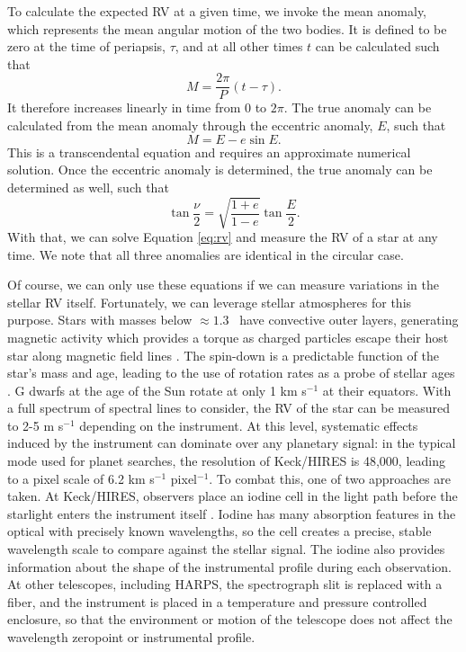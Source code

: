 To calculate the expected RV at a given time, we invoke the mean anomaly, which represents the mean angular motion of the 
two bodies. 
It is defined to be zero at the time of periapsis, $\tau$, and at all other times $t$ can 
be calculated such that
\begin{equation}
M = \frac{2\pi}{P}(t-\tau).
\end{equation}
It therefore increases linearly in time from 0 to $2\pi$.
The true anomaly can be calculated from the mean anomaly through the eccentric anomaly, 
$E$, such that
\begin{equation}
M = E - e \sin E.
\end{equation}
This is a transcendental equation and requires an approximate numerical solution.
Once the eccentric anomaly is determined, the true anomaly can be determined as well,
such that
\begin{equation}
\tan \frac{\nu}{2} = \sqrt{\frac{1+e}{1-e}} \tan \frac{E}{2}.
\end{equation}
With that, we can solve Equation \ref{eq:rv} and measure the RV of a star at any time.
We note that all three anomalies are identical in the circular case.

Of course, we can only use these equations if we can measure variations in the stellar RV
itself.
Fortunately, we can leverage stellar atmospheres for this purpose.
Stars with masses below $\approx 1.3$ \msun\ have convective outer layers, generating
magnetic activity which provides a torque as charged particles escape their 
host star along magnetic
field lines \citep{Shu94}.
The spin-down is a predictable function of the star's mass and age, leading to the use
of rotation rates as a probe of stellar ages \citep{Barnes03}.
G dwarfs at the age of the Sun rotate at only 1 km s$^{-1}$ at their equators.
With a full spectrum of spectral lines to consider, the RV of the star can be 
measured to 2-5 m s$^{-1}$ depending on the instrument.
At this level, systematic effects induced by the instrument can dominate over any planetary
signal: in the typical mode used for planet searches,
the resolution of Keck/HIRES is 48,000, leading to a pixel scale of 6.2 km s$^{-1}$ pixel$^{-1}$.
To combat this, one of two approaches are taken.
At Keck/HIRES, observers place an iodine cell in the light path before the starlight
enters the instrument itself \citep{Butler96}.
Iodine has many absorption features in the optical with precisely known wavelengths,
so the cell creates a precise, stable wavelength scale to compare against the stellar
signal. 
The iodine also provides information about the shape of the instrumental profile during
each observation.
At other telescopes, including HARPS, the spectrograph slit is replaced with a fiber,
and the instrument is placed in a temperature and pressure controlled enclosure, so that
the environment or motion of the telescope does not affect the wavelength zeropoint or
instrumental profile.


